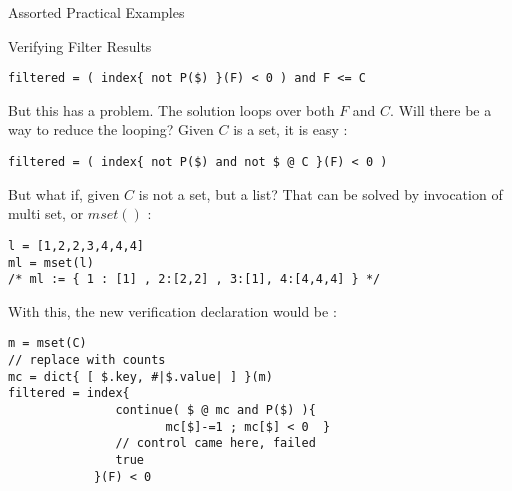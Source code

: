 \begin{section}{Assorted Practical Examples}
\begin{subsection}{Verifying Filter Results}
\begin{center}\begin{minipage}{\linewidth}
\begin{lstlisting}[style=JexlStyle]
filtered = ( index{ not P($) }(F) < 0 ) and F <= C  
\end{lstlisting}  
\end{minipage}\end{center}
But this has a problem. The solution loops over both $F$ and $C$. 
Will there be a way to reduce the looping? Given $C$ is a set, it is easy :

\begin{center}\begin{minipage}{\linewidth}
\begin{lstlisting}[style=JexlStyle]
filtered = ( index{ not P($) and not $ @ C }(F) < 0 )
\end{lstlisting}  
\end{minipage}\end{center}

But what if, given $C$ is not a set, but a list? That can be solved by
invocation of multi set, or $mset()$  :
\begin{center}\begin{minipage}{\linewidth}
\begin{lstlisting}[style=JexlStyle]
l = [1,2,2,3,4,4,4]
ml = mset(l)
/* ml := { 1 : [1] , 2:[2,2] , 3:[1], 4:[4,4,4] } */
\end{lstlisting}  
\end{minipage}\end{center}
With this, the new verification declaration would be :

\begin{center}\begin{minipage}{\linewidth}
\begin{lstlisting}[style=JexlStyle]
m = mset(C)
// replace with counts 
mc = dict{ [ $.key, #|$.value| ] }(m)
filtered = index{ 
               continue( $ @ mc and P($) ){  
                      mc[$]-=1 ; mc[$] < 0  }
               // control came here, failed         
               true    
            }(F) < 0 
\end{lstlisting}  
\end{minipage}\end{center}
 
\end{subsection}

\end{section}

